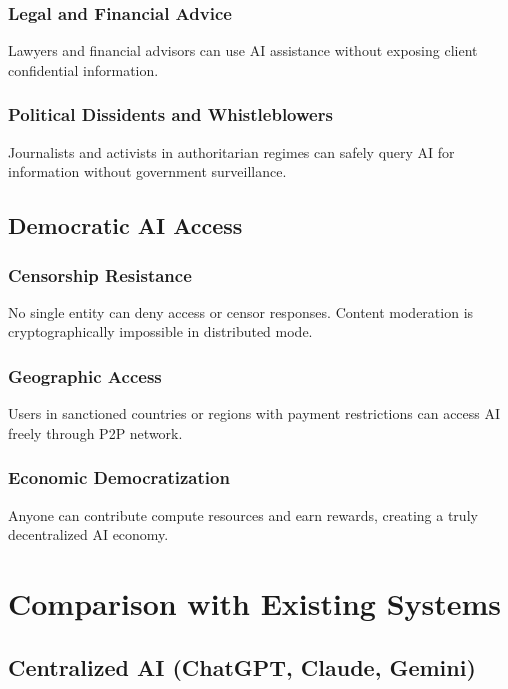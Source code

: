\documentclass[11pt,a4paper]{article}
\begin{document}
\subsubsection{Legal and Financial Advice}

Lawyers and financial advisors can use AI assistance without exposing client confidential information.

\subsubsection{Political Dissidents and Whistleblowers}

Journalists and activists in authoritarian regimes can safely query AI for information without government surveillance.

\subsection{Democratic AI Access}

\subsubsection{Censorship Resistance}

No single entity can deny access or censor responses. Content moderation is cryptographically impossible in distributed mode.

\subsubsection{Geographic Access}

Users in sanctioned countries or regions with payment restrictions can access AI freely through P2P network.

\subsubsection{Economic Democratization}

Anyone can contribute compute resources and earn rewards, creating a truly decentralized AI economy.

\newpage
\section{Comparison with Existing Systems}

\subsection{Centralized AI (ChatGPT, Claude, Gemini)}
\end{document}
